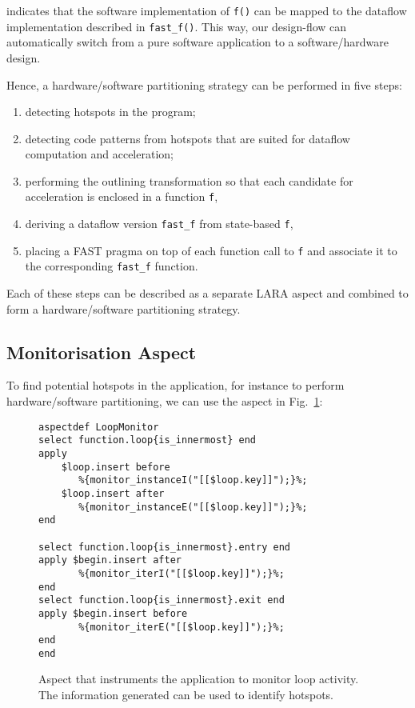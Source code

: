 \noindent indicates that the software implementation of \texttt{f()} can be
mapped to the dataflow implementation described in \texttt{fast\_f()}. This
way, our design-flow can automatically switch from a pure software
application to a software/hardware design.

Hence, a hardware/software partitioning strategy can be performed in
five steps:
\begin{enumerate}
  \item detecting hotspots in the program;
  \item detecting code patterns from hotspots that are suited for
    dataflow computation and acceleration;
  \item performing the outlining transformation so that each
    candidate for acceleration is enclosed in a function \texttt{f},
  \item deriving a dataflow version \texttt{fast\_f} from state-based
    \texttt{f},
  \item placing a FAST pragma on top of each function call to
    \texttt{f} and associate it to the corresponding \texttt{fast\_f}
    function.
\end{enumerate}

Each of these steps can be described as a separate LARA aspect and
combined to form a hardware/software partitioning strategy.

\subsection{Monitorisation Aspect}
\label{sect:asp_mon}
To find potential hotspots in the application, for instance to perform
hardware/software partitioning, we can use the aspect in Fig.~\ref{fig:hotspot}:

\lstset{style=lara}
\begin{figure}[!h]
\begin{lstlisting}
aspectdef LoopMonitor
select function.loop{is_innermost} end
apply
    $loop.insert before
       %{monitor_instanceI("[[$loop.key]]");}%;
    $loop.insert after
       %{monitor_instanceE("[[$loop.key]]");}%;
end

select function.loop{is_innermost}.entry end
apply $begin.insert after
       %{monitor_iterI("[[$loop.key]]");}%;
end
select function.loop{is_innermost}.exit end
apply $begin.insert before
       %{monitor_iterE("[[$loop.key]]");}%;
end
end
\end{lstlisting}
\caption{Aspect that instruments the application to monitor loop
  activity. The information generated can be used to identify
  hotspots.}
\label{fig:hotspot}
\end{figure}

